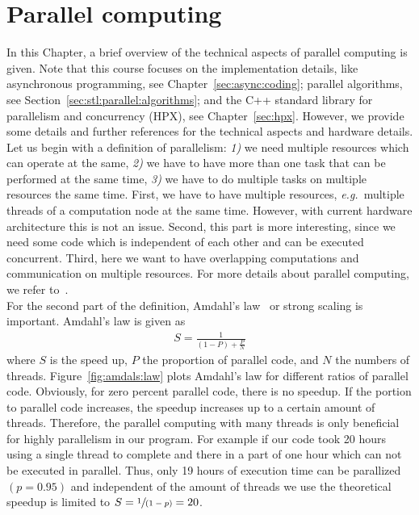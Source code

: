 \documentclass[11pt,fleqn]{book} %
\begin{document}
\chapter{Parallel computing}
In this Chapter, a brief overview of the technical aspects of parallel computing is given. Note that this course focuses on the implementation details, like asynchronous programming, see Chapter~\ref{sec:async:coding}; parallel algorithms, see Section~\ref{sec:stl:parallel:algorithms}; and the C++ standard library for parallelism and concurrency (HPX), see Chapter~\ref{sec:hpx}. However, we provide some details and further references for the technical aspects and hardware details.\\

Let us begin with a definition of parallelism: \textit{1)} we need multiple resources which can operate at the same, \textit{2)} we have to have more than one task that can be performed at the same time, \textit{3)} we have to do multiple tasks on multiple resources the same time. First, we have to have multiple resources, \emph{e.g.}\ multiple threads of a computation node at the same time. However, with current hardware architecture this is not an issue. Second, this part is more interesting, since we need some code which is independent of each other and can be executed concurrent. Third, here we want to have overlapping computations and communication on multiple resources. For more details about parallel computing, we refer to~\cite{grama2003introduction,trobec2018introduction}.\\

For the second part of the definition, Amdahl's law~\cite{amdahl1967validity} or strong scaling is important. Amdahl's law is given as
\begin{align}
S = \frac{1}{(1-P) + \frac{P}{N}}
\end{align}
where $S$ is the speed up, $P$ the proportion of parallel code, and $N$ the numbers of threads. Figure~\ref{fig:amdals:law} plots Amdahl's law for different ratios of parallel code. Obviously, for zero percent parallel code, there is no speedup. If the portion to parallel code increases, the speedup increases up to a certain amount of threads. Therefore, the parallel computing with many threads is only beneficial for highly parallelism in our program. For example if our code took 20 hours using a single thread to complete and there in a part of one hour which can not be executed in parallel. Thus, only 19 hours of execution time can be parallized $(p=0.95)$ and independent of the amount of threads we use the theoretical speedup is limited to $S=\sfrac{1}{(1-p)}=20$.\\
\end{document}

